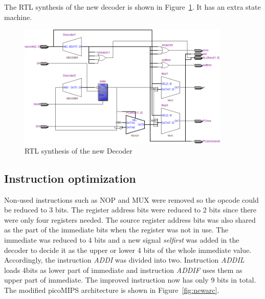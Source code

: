 The RTL synthesis of the new decoder is shown in Figure~\ref{fig:newdecoder}. It has an extra state machine.

\begin{figure}[H]
		\centering
		\includegraphics[width = 0.9\textwidth]{Figures/newdecoder}		
		\caption{RTL synthesis of the new Decoder}
		\label {fig:newdecoder}
\end{figure}

\subsection{Instruction optimization}
Non-used instructions such as NOP and MUX were removed so the opcode could be reduced to 3 bits. The register address bits were reduced to 2 bits since there were only four registers needed. The source register address bits was also shared as the part of the immediate bits when the register was not in use. The immediate was reduced to 4 bits and a new signal \textit{selfirst} was added in the decoder to decide it as the upper or lower 4 bits of the whole immediate value. Accordingly, the instruction \textit{ADDI} was divided into two. Instruction \textit{ADDIL} loads 4bits as lower part of immediate and instruction \textit{ADDIF} uses them as upper part of immediate. The improved instruction now has only 9 bits in total. The modified picoMIPS architecture is shown in Figure~\ref{fig:newarc}. 

